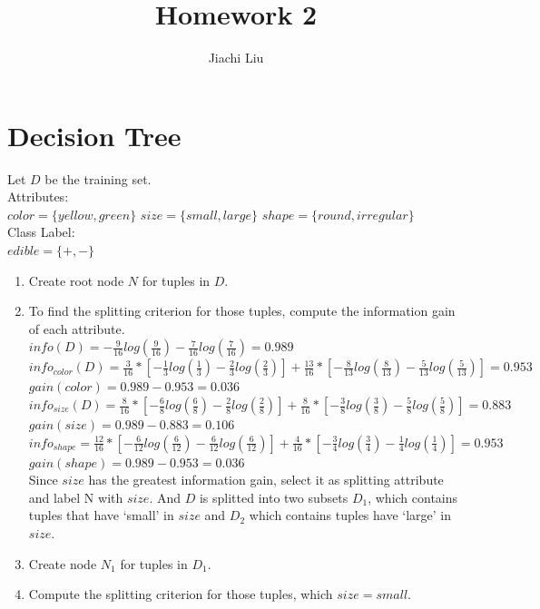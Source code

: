 \documentclass[11pt]{article} %
\title{Homework 2}
\author{Jiachi Liu}
\begin{document}
\maketitle

\section{Decision Tree}
Let $D$ be the training set.\\
Attributes:\\
$color = \{yellow,green\}$
$size = \{small,large\}$
$shape = \{round,irregular\}$\\
Class Label:\\
$edible=\{+,-\}$

\begin{enumerate}
\item Create root node $N$ for tuples in  $D$.
\item To find the splitting criterion for those tuples, compute the information gain of each attribute.\\
$info(D) = -\frac{9}{16}log(\frac{9}{16})-\frac{7}{16}log(\frac{7}{16})=0.989$\\
$info_{color}(D) = \frac{3}{16}*[-\frac{1}{3}log(\frac{1}{3})-\frac{2}{3}log({\frac{2}{3}})] +
 				\frac{13}{16}*[-\frac{8}{13}log(\frac{8}{13})-\frac{5}{13}log({\frac{5}{13}})] =0.953$\\
$gain(color)=0.989 - 0.953 = 0.036$\\
$info_{size}(D)=\frac{8}{16}*[-\frac{6}{8}log(\frac{6}{8})-\frac{2}{8}log(\frac{2}{8})] +
			 \frac{8}{16}*[-\frac{3}{8}log(\frac{3}{8})-\frac{5}{8}log(\frac{5}{8})] = 0.883 $\\
$gain(size)=0.989-0.883=0.106$\\
$info_{shape} = \frac{12}{16}*[-\frac{6}{12}log(\frac{6}{12})-\frac{6}{12}log(\frac{6}{12})]+
			\frac{4}{16}*[-\frac{3}{4}log(\frac{3}{4})-\frac{1}{4}log(\frac{1}{4})] = 0.953$\\
$gain(shape) = 0.989-0.953=0.036$\\
Since $size$ has the greatest information gain, select it as splitting attribute and label N with $size$. And $D$ is splitted into two subsets $D_1$, which contains tuples that have `small' in $size$ and $D_2$ which contains tuples have `large' in $size$.
\item Create node $N_1$ for tuples in $D_1$.
\item Compute the splitting criterion for those tuples, which $size=small$.\\

\end{enumerate}
\end{document}

